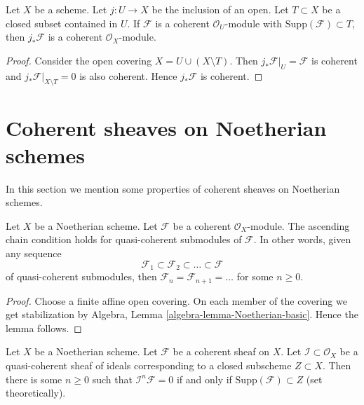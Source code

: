 \begin{lemma}
\label{lemma-pushforward-coherent-on-open}
Let $X$ be a scheme. Let $j : U \to X$ be the inclusion of an open.
Let $T \subset X$ be a closed subset contained in $U$.
If $\mathcal{F}$ is a coherent $\mathcal{O}_U$-module
with $\text{Supp}(\mathcal{F}) \subset T$, then
$j_*\mathcal{F}$ is a coherent $\mathcal{O}_X$-module.
\end{lemma}

\begin{proof}
Consider the open covering $X = U \cup (X \setminus T)$.
Then $j_*\mathcal{F}|_U = \mathcal{F}$ is coherent and
$j_*\mathcal{F}|_{X \setminus T} = 0$ is also coherent.
Hence $j_*\mathcal{F}$ is coherent.
\end{proof}














\section{Coherent sheaves on Noetherian schemes}
\label{section-coherent-quasi-compact}

\noindent
In this section we mention some properties of coherent sheaves on
Noetherian schemes.

\begin{lemma}
\label{lemma-acc-coherent}
Let $X$ be a Noetherian scheme.
Let $\mathcal{F}$ be a coherent $\mathcal{O}_X$-module.
The ascending chain condition holds for quasi-coherent submodules
of $\mathcal{F}$. In other words, given any sequence
$$
\mathcal{F}_1 \subset \mathcal{F}_2 \subset \ldots \subset \mathcal{F}
$$
of quasi-coherent submodules, then
$\mathcal{F}_n = \mathcal{F}_{n + 1} = \ldots $ for some $n \geq 0$.
\end{lemma}

\begin{proof}
Choose a finite affine open covering.
On each member of the covering we get stabilization by
Algebra, Lemma \ref{algebra-lemma-Noetherian-basic}.
Hence the lemma follows.
\end{proof}

\begin{lemma}
\label{lemma-power-ideal-kills-sheaf}
\begin{reference}
\cite[Chapter II, \S 2, no. 39, Remark, p. 232]{FAC}
\end{reference}
Let $X$ be a Noetherian scheme.
Let $\mathcal{F}$ be a coherent sheaf on $X$.
Let $\mathcal{I} \subset \mathcal{O}_X$ be a quasi-coherent
sheaf of ideals corresponding to a closed subscheme $Z \subset X$.
Then there is some $n \geq 0$ such that $\mathcal{I}^n\mathcal{F} = 0$
if and only if $\text{Supp}(\mathcal{F}) \subset Z$ (set theoretically).
\end{lemma}

